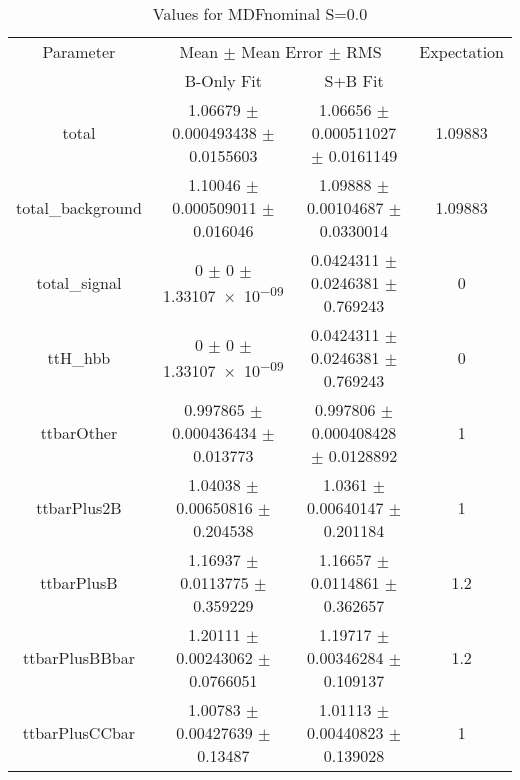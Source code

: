 \begin{table}
\centering
\caption{Values for MDFnominal S=0.0}
\begin{tabular}{cccc}
\toprule
Parameter & \multicolumn{2}{c}{Mean $\pm$ Mean Error $\pm$ RMS} & Expectation\\
 & B-Only Fit & S+B Fit & \\
\midrule
total & \num{1.06679} $\pm$ \num{0.000493438} $\pm$ \num{0.0155603} & \num{1.06656} $\pm$ \num{0.000511027} $\pm$ \num{0.0161149} & \num{1.09883}\\
total\_background & \num{1.10046} $\pm$ \num{0.000509011} $\pm$ \num{0.016046} & \num{1.09888} $\pm$ \num{0.00104687} $\pm$ \num{0.0330014} & \num{1.09883}\\
total\_signal & \num{0} $\pm$ \num{0} $\pm$ \num{1.33107e-09} & \num{0.0424311} $\pm$ \num{0.0246381} $\pm$ \num{0.769243} & \num{0}\\
ttH\_hbb & \num{0} $\pm$ \num{0} $\pm$ \num{1.33107e-09} & \num{0.0424311} $\pm$ \num{0.0246381} $\pm$ \num{0.769243} & \num{0}\\
ttbarOther & \num{0.997865} $\pm$ \num{0.000436434} $\pm$ \num{0.013773} & \num{0.997806} $\pm$ \num{0.000408428} $\pm$ \num{0.0128892} & \num{1}\\
ttbarPlus2B & \num{1.04038} $\pm$ \num{0.00650816} $\pm$ \num{0.204538} & \num{1.0361} $\pm$ \num{0.00640147} $\pm$ \num{0.201184} & \num{1}\\
ttbarPlusB & \num{1.16937} $\pm$ \num{0.0113775} $\pm$ \num{0.359229} & \num{1.16657} $\pm$ \num{0.0114861} $\pm$ \num{0.362657} & \num{1.2}\\
ttbarPlusBBbar & \num{1.20111} $\pm$ \num{0.00243062} $\pm$ \num{0.0766051} & \num{1.19717} $\pm$ \num{0.00346284} $\pm$ \num{0.109137} & \num{1.2}\\
ttbarPlusCCbar & \num{1.00783} $\pm$ \num{0.00427639} $\pm$ \num{0.13487} & \num{1.01113} $\pm$ \num{0.00440823} $\pm$ \num{0.139028} & \num{1}\\
\bottomrule
\end{tabular}
\end{table}